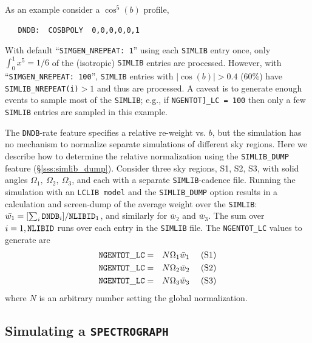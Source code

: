 \documentclass[12pt]{article}
\newcommand{\SPEC}{{\tt SPECTROGRAPH}}
\begin{document}
\medskip
As an  example consider a $\cos^5(b)$ profile,
\vspace{-0.2cm}
\begin{verbatim}
   DNDB:  COSBPOLY  0,0,0,0,0,1
\end{verbatim}
With default ``{\tt SIMGEN\_NREPEAT: 1}'' using each
{\tt SIMLIB} entry once,
only $\int_0^1 x^5 = 1/6$ of the (isotropic) {\tt SIMLIB} entries
are processed.
However, with ``{\tt SIMGEN\_NREPEAT: 100}'', 
{\tt SIMLIB} entries with $|\cos(b)| > 0.4$ (60\%) have 
{\tt SIMLIB\_NREPEAT(i)}$>1$ and thus are processed.
A caveat is to generate enough events to sample most of
the {\tt SIMLIB}; e.g., if {\tt NGENTOT]\_LC = 100} then
only a few {\tt SIMLIB} entries are sampled in this example.


\clearpage
The {\tt DNDB}-rate feature specifies a relative re-weight vs. $b$,
but the simulation has no mechanism to normalize separate simulations
of different sky regions. Here we describe how to determine
the relative normalization using the 
{\tt SIMLIB\_DUMP} feature (\S\ref{sss:simlib_dump}).
Consider three sky regions, S1, S2, S3, with solid angles
$\Omega_1,~\Omega_2,~\Omega_3$, and each with a separate 
{\tt SIMLIB}-cadence file.
Running the simulation with an {\tt LCLIB model} and the
{\tt SIMLIB\_DUMP} option results in a calculation and screen-dump
of the average weight over the {\tt SIMLIB}: 
$\bar{w_1} = [\sum_i{\tt DNDB}_i]/{\tt NLIBID}_1$,
and similarly for $\bar{w}_2$ and $\bar{w}_3$. 
The sum over $i=1, {\tt NLIBID}$ runs over each entry in the 
{\tt SIMLIB} file. The {\tt NGENTOT\_LC} values to generate are
%
\begin{eqnarray}
 {\tt NGENTOT\_LC} & = & N \Omega_1 \bar{w}_1~~~~({\rm S1}) 
    \nonumber \\
 {\tt NGENTOT\_LC} & = & N \Omega_2 \bar{w}_2~~~~({\rm S2}) 
    \nonumber \\
 {\tt NGENTOT\_LC} & = & N \Omega_3 \bar{w}_3~~~~({\rm S3}) 
    \nonumber
\end{eqnarray}
%
where $N$ is an arbitrary number setting the global normalization.

  \clearpage
   \subsection{Simulating a {\SPEC} }
   \label{subsec:sim_spec}
\end{document}

